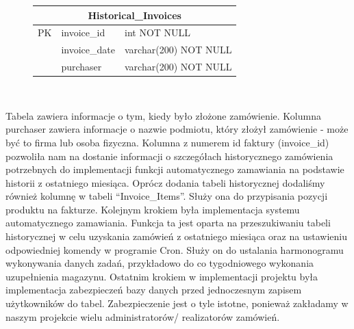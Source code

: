 \documentclass{article}
\begin{document}
\begin{figure}[H]
   \centering
   \begin{tabular}{|c|l|l|} \hline
      \multicolumn{3}{|c|}{Historical\_Invoices} \\ \hline
      PK & invoice\_id   & int NOT NULL          \\ \hline
         & invoice\_date & varchar(200) NOT NULL \\
         & purchaser     & varchar(200) NOT NULL \\ \hline
   \end{tabular} \\
\end{figure}
\vspace{0.3cm}
Tabela zawiera informacje o tym, kiedy było złożone zamówienie.
Kolumna purchaser zawiera informacje o nazwie podmiotu, który złożył zamówienie
- może być to firma lub osoba fizyczna. Kolumna z numerem id faktury (invoice\_id) pozwoliła nam na
dostanie informacji o szczegółach historycznego zamówienia potrzebnych do implementacji funkcji
automatycznego zamawiania na podstawie historii z ostatniego miesiąca. Oprócz dodania tabeli
historycznej dodaliśmy również kolumnę w tabeli ``Invoice\_Items''. Służy ona do przypisania pozycji
produktu na fakturze. Kolejnym krokiem była implementacja systemu automatycznego zamawiania. Funkcja ta jest oparta na przeszukiwaniu tabeli
historycznej w celu uzyskania zamówień z ostatniego miesiąca oraz na ustawieniu odpowiedniej komendy
w programie Cron. Służy on do ustalania harmonogramu wykonywania danych zadań, przykładowo do
co tygodniowego wykonania uzupełnienia magazynu. Ostatnim krokiem w implementacji projektu była
implementacja zabezpieczeń bazy danych przed jednoczesnym zapisem użytkowników do tabel.
Zabezpieczenie jest o tyle istotne, ponieważ zakładamy w naszym projekcie wielu administratorów/
realizatorów zamówień.
\end{document}
